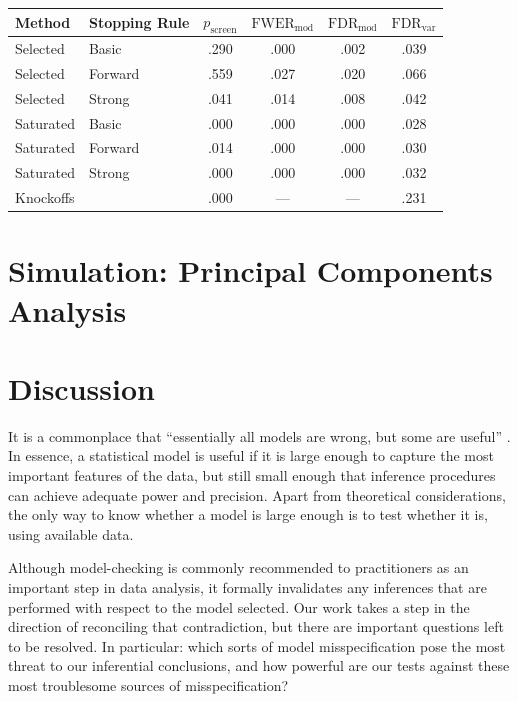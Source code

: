 \documentclass{article}
\begin{document}
\begin{table}[ht]
  \centering
  \begin{tabular}{llcccc}
    \hline
    Method & Stopping Rule & $p_{\text{screen}}$ & $\text{FWER}_{\text{mod}}$ 
    & $\text{FDR}_{\text{mod}}$ 
    & $\text{FDR}_{\text{var}}$ \\ 
    \hline
    Selected & Basic & .290 & .000 & .002 & .039 \\ 
    Selected & Forward & .559 & .027 & .020 & .066 \\ 
    Selected & Strong & .041 & .014 & .008 & .042 \\ 
    \hline
    Saturated & Basic & .000 & .000 & .000 & .028 \\ 
    Saturated & Forward & .014 & .000 & .000 & .030 \\ 
    Saturated & Strong & .000 & .000 & .000 & .032 \\ 
    \hline
    Knockoffs & & .000 & --- & --- & .231 \\ 
    \hline
  \end{tabular}
  \caption{}
\end{table}



\section{Simulation: Principal Components Analysis}\label{sec:pca}



\section{Discussion}

It is a commonplace that ``essentially all models are wrong, but some are useful'' \citep{box1987empirical}. In essence, a statistical model is useful if it is large enough to capture the most important features of the data, but still small enough that inference procedures can achieve adequate power and precision. Apart from theoretical considerations, the only way to know whether a model is large enough is to test whether it is, using available data.

Although model-checking is commonly recommended to practitioners as an important step in data analysis, it formally invalidates any inferences that are performed with respect to the model selected. Our work takes a step in the direction of reconciling that contradiction, but there are important questions left to be resolved. In particular: which sorts of model misspecification pose the most threat to our inferential conclusions, and how powerful are our tests against these most troublesome sources of misspecification? 
\end{document}
